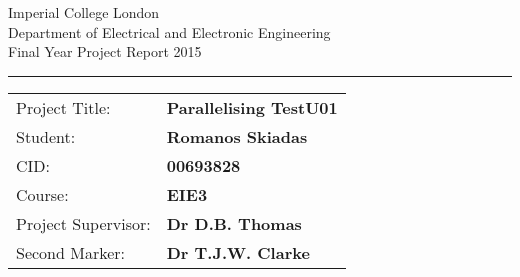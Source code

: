 \begin{titlepage}
                \setlength{\parindent}{0pt}
                \setlength{\parskip}{0pt}

                {
                                \Large
                                \raggedright
                                Imperial College London\\[17pt]
                                Department of Electrical and Electronic Engineering\\[17pt]
                                Final Year Project Report 2015\\[17pt]
 
                }

                \rule{\columnwidth}{3pt}
                \setlength{\tabcolsep}{0pt}

                \begin{tabular}{p{40mm}p{\dimexpr\columnwidth-40mm}}
                                Project Title: & \textbf{Parallelising TestU01} \\[12pt]
                                Student: & \textbf{Romanos Skiadas} \\[12pt]
                                CID: & \textbf{00693828} \\[12pt]
                                Course: & \textbf{EIE3} \\[12pt]
                                Project Supervisor: & \textbf{Dr D.B. Thomas} \\[12pt]
                                Second Marker: & \textbf{Dr T.J.W. Clarke} \\
                \end{tabular}
\end{titlepage}
